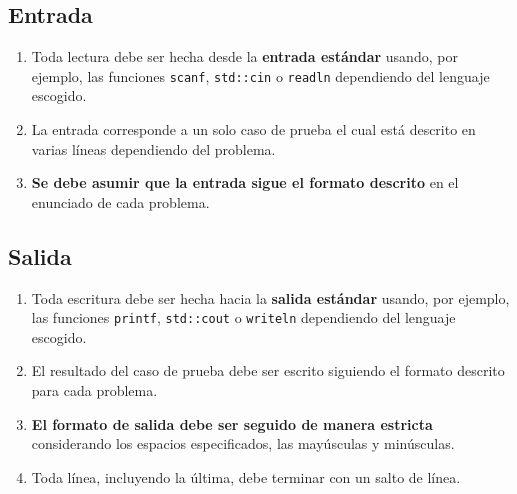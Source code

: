 \documentclass[12pt]{oci}
\begin{document}
\subsection*{Entrada}
\begin{enumerate}
\itemsep 0em
\item Toda lectura debe ser hecha desde la {\bf entrada est\'andar} usando, por ejemplo, las funciones \verb+scanf+, \verb+std::cin+ o \verb+readln+ dependiendo del lenguaje escogido.
\item La entrada corresponde a un solo caso de prueba el cual est\'a descrito en varias l\'ineas dependiendo del problema.
\item {\bf Se debe asumir que la entrada sigue el formato descrito} en el enunciado de cada problema.
\end{enumerate}

\subsection*{Salida}
\begin{enumerate}
\itemsep 0em
\item Toda escritura debe ser hecha hacia la {\bf salida est\'andar} usando, por ejemplo, las funciones \verb+printf+, \verb+std::cout+ o \verb+writeln+ dependiendo del lenguaje escogido.
\item El resultado del caso de prueba debe ser escrito siguiendo el formato descrito para cada problema.
\item {\bf El formato de salida debe ser seguido de manera estricta} considerando los espacios especificados, las may\'usculas y min\'usculas.
\item Toda l\'inea, incluyendo la \'ultima, debe terminar con un salto de l\'inea.
\end{enumerate}
\end{document}
